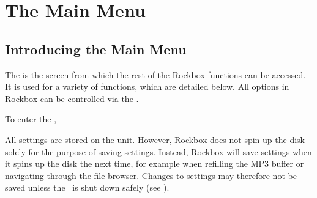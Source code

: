\chapter{The Main Menu}

\section{Introducing the Main Menu}
The  is the screen from which the rest of the Rockbox functions can be 
accessed. It is used for a variety of functions, which are detailed below. 
All options in Rockbox can be controlled via the .

To enter the , 

All settings are stored on the unit. However, Rockbox does not spin up 
the disk solely for the purpose of saving settings.  Instead, Rockbox will
save settings when it spins up the disk the next time, for example when 
refilling the MP3 buffer or navigating through the file browser. Changes to 
settings may therefore not be saved unless the \dap\ is shut down safely 
(see ).

